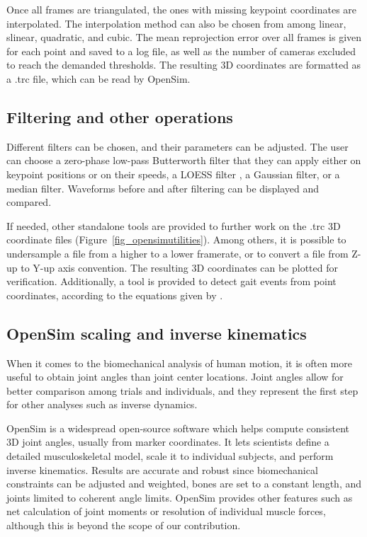 Once all frames are triangulated, the ones with missing keypoint coordinates are interpolated. The interpolation method can also be chosen from among linear, slinear, quadratic, and cubic. The mean reprojection error over all frames is given for each point and saved to a log file, as well as the number of cameras excluded to reach the demanded thresholds. The resulting 3D coordinates are formatted as a .trc file, which can be read by OpenSim.


\subsection{Filtering and other operations}

Different filters can be chosen, and their parameters can be adjusted. The user can choose a zero-phase low-pass Butterworth filter \cite{Butterworth1930} that they can apply either on keypoint positions or on their speeds, a LOESS filter \cite{Cleveland1981}, a Gaussian filter, or a median filter. Waveforms before and after filtering can be displayed and compared.

If needed, other standalone tools are provided to further work on the .trc 3D coordinate files (Figure~\ref{fig_opensimutilities}). Among others, it is possible to undersample a file from a higher to a lower framerate, or to convert a file from Z-up to Y-up axis convention. The resulting 3D coordinates can be plotted for verification. Additionally, a tool is provided to detect gait events from point coordinates, according to the equations given by \cite{Zeni2008}.


\subsection{OpenSim scaling and inverse kinematics}

When it comes to the biomechanical analysis of human motion, it is often more useful to obtain joint angles than joint center locations. Joint angles allow for better comparison among trials and individuals, and they represent the first step for other analyses such as inverse dynamics. 

OpenSim \cite{Delp2007,Seth2018} is a widespread open-source software which helps compute consistent 3D joint angles, usually from marker coordinates. It lets scientists define a detailed musculoskeletal model, scale it to individual subjects, and perform inverse kinematics. Results are accurate and robust since biomechanical constraints can be adjusted and weighted, bones are set to a constant length, and joints limited to coherent angle limits. OpenSim provides other features such as net calculation of joint moments or resolution of individual muscle forces, although this is beyond the scope of our contribution.

